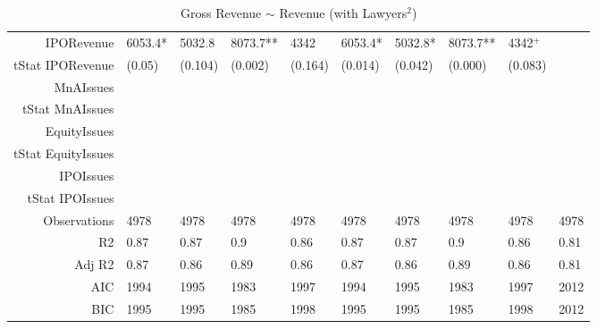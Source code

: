 \begin{table}[ht]
\begin{tabular}{rlllllllll}
  IPORevenue & 6053.4* & 5032.8 & 8073.7** & 4342 & 6053.4* & 5032.8* & 8073.7** & 4342$^{+}$ &  \\ 
  tStat IPORevenue & (0.05) & (0.104) & (0.002) & (0.164) & (0.014) & (0.042) & (0.000) & (0.083) &  \\ 
  MnAIssues &  &  &  &  &  &  &  &  &  \\ 
  tStat MnAIssues &  &  &  &  &  &  &  &  &  \\ 
  EquityIssues &  &  &  &  &  &  &  &  &  \\ 
  tStat EquityIssues &  &  &  &  &  &  &  &  &  \\ 
  IPOIssues &  &  &  &  &  &  &  &  &  \\ 
  tStat IPOIssues &  &  &  &  &  &  &  &  &  \\ 
  Observations & 4978 & 4978 & 4978 & 4978 & 4978 & 4978 & 4978 & 4978 & 4978 \\ 
  R2 & 0.87 & 0.87 & 0.9 & 0.86 & 0.87 & 0.87 & 0.9 & 0.86 & 0.81 \\ 
  Adj R2 & 0.87 & 0.86 & 0.89 & 0.86 & 0.87 & 0.86 & 0.89 & 0.86 & 0.81 \\ 
  AIC & 1994 & 1995 & 1983 & 1997 & 1994 & 1995 & 1983 & 1997 & 2012 \\ 
  BIC & 1995 & 1995 & 1985 & 1998 & 1995 & 1995 & 1985 & 1998 & 2012 \\ 
   \hline
\end{tabular}
\caption{Gross Revenue $\sim$ Revenue (with Lawyers$^2$)} 
\end{table}
